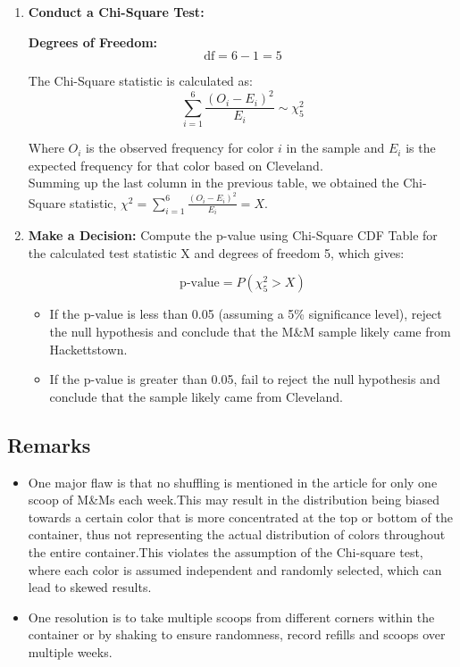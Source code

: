 \documentclass{article}
\begin{document}
\begin{enumerate}
    \item \textbf{Conduct a Chi-Square Test:}

    \textbf{Degrees of Freedom:} 
    \[\text{df} = 6 - 1 = 5\]
    
    The Chi-Square statistic is calculated as:
    \[ \sum_{i=1}^{6} \frac{(O_i - E_i)^2}{E_i} \sim \chi^2_5\]
    
    Where \( O_i \) is the observed frequency for color \( i \) in the sample and \( E_i \) is the expected frequency for that color based on Cleveland. \\

    Summing up the last column in the previous table, we obtained the Chi-Square statistic, \( \chi^2 = \sum_{i=1}^{6} \frac{(O_i - E_i)^2}{E_i} = X\).

    
    \item \textbf{Make a Decision:}
    Compute the p-value using Chi-Square CDF Table for the calculated test statistic X and degrees of freedom 5, which gives:

    \[
    \text{p-value} = P(\chi^2_5 > X)
    \]
    \begin{itemize}
        \item If the p-value is less than 0.05 (assuming a 5\% significance level), reject the null hypothesis and conclude that the M\&M sample likely came from Hackettstown. 
        \item If the p-value is greater than 0.05, fail to reject the null hypothesis and conclude that the sample likely came from Cleveland.
    \end{itemize}
\end{enumerate}

\subsection*{Remarks}
\begin{itemize}
    \item One major flaw is that no shuffling is mentioned in the article for only one scoop of M\&Ms each week.This may result in the distribution being biased towards a certain color that is more concentrated at the top or bottom of the container, thus not representing the actual distribution of colors throughout the entire container.This violates the assumption of the Chi-square test, where each color is assumed independent and randomly selected, which can lead to skewed results. 
    \item One resolution is to take multiple scoops from different corners within the container or by shaking to ensure randomness, record refills and scoops over multiple weeks.
    
\end{itemize}
\end{document}
